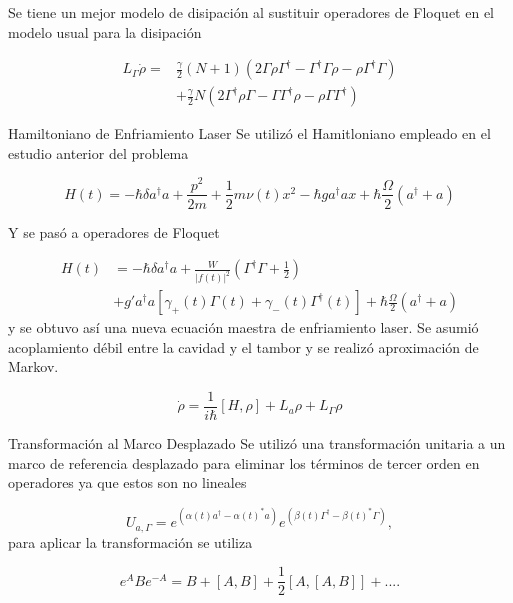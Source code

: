 \documentclass[10pt]{beamer}
\begin{document}
\begin{frame}
Se tiene un mejor modelo de disipación al sustituir operadores de Floquet en el modelo usual para la disipación

\begin{align*} 
L_\Gamma \dot{\rho}=&\frac{\gamma}{2}(N+1)(2\Gamma\rho\Gamma^\dagger - \Gamma^\dagger\Gamma \rho - \rho \Gamma^\dagger \Gamma )\\
 &+ \frac{\gamma}{2}N(2\Gamma^\dagger \rho \Gamma - \Gamma \Gamma^\dagger \rho - \rho \Gamma\Gamma^\dagger)
\end{align*}
\end{frame}


\begin{frame}{Hamiltoniano de Enfriamiento Laser}
Se utilizó el Hamitloniano empleado en el estudio anterior del problema

\begin{equation*}
H(t) = -\hbar \delta a^\dagger a + \frac{p^2}{2m} + \frac{1}{2}m \nu (t) x^2 -\hbar g a^\dagger a x + \hbar\frac{\Omega}{2}(a^\dagger + a)
\end{equation*}

Y se pasó a operadores de Floquet

\end{frame}

\begin{frame}
\begin{align*}
H(t) &= -\hbar \delta a^\dagger a + \frac{W}{|f(t)|^2}(\Gamma^\dagger \Gamma + \frac{1}{2}) \\
&+  g'a^\dagger a[\gamma_+(t)\Gamma (t) +\gamma_-(t)\Gamma^\dagger (t)] + \hbar\frac{\Omega}{2}(a^\dagger + a)
\end{align*} y se obtuvo así una nueva ecuación maestra de enfriamiento laser. Se asumió acoplamiento débil entre la cavidad y el tambor y se realizó aproximación de Markov.

\begin{equation*}
\dot{\rho} = \frac{1}{i\hbar}[H,\rho] + L_a\rho + L_\Gamma \rho
\end{equation*}
\end{frame}

\begin{frame}{Transformación al Marco Desplazado}
Se utilizó una transformación unitaria a un marco de referencia desplazado para eliminar los términos de tercer orden en operadores ya que estos son no lineales

\begin{equation*}
U_{a,\Gamma} = e^{(\alpha(t) a^\dagger - \alpha(t)^*a)}e^{(\beta(t) \Gamma^\dagger - \beta(t)^*\Gamma)},
\end{equation*} para aplicar la transformación se utiliza

\begin{equation*}
e^{A} B e^{-A} = B + [A,B] + \frac{1}{2}[A,[A,B]] + ... .
\end{equation*}
\end{frame}
\end{document}
